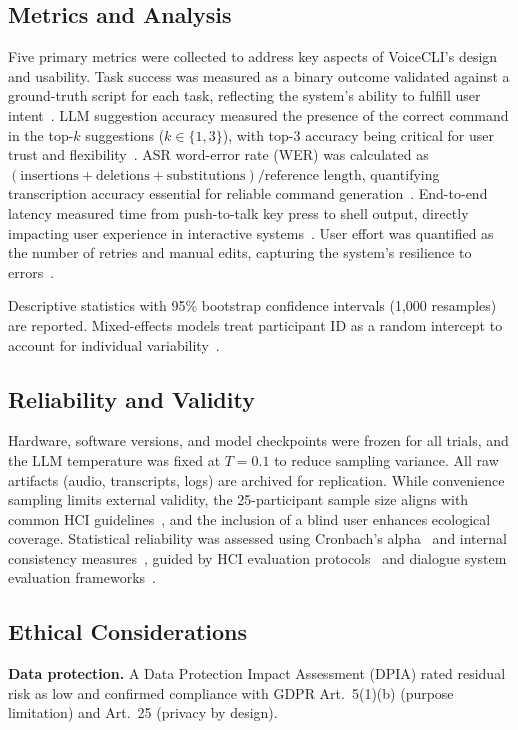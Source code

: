 \documentclass[a4paper,12pt]{article}
\begin{document}
\subsection{Metrics and Analysis}
\label{sec:metrics}
\noindent Five primary metrics were collected to address key aspects of VoiceCLI's design and usability. Task success was measured as a binary outcome validated against a ground-truth script for each task, reflecting the system's ability to fulfill user intent~\cite{ref4}. LLM suggestion accuracy measured the presence of the correct command in the top-$k$ suggestions ($k \in \{1,3\}$), with top-3 accuracy being critical for user trust and flexibility~\cite{ref5}. ASR word-error rate (WER) was calculated as $(\text{insertions}+\text{deletions}+\text{substitutions})/\text{reference length}$, quantifying transcription accuracy essential for reliable command generation~\cite{ref5}. End-to-end latency measured time from push-to-talk key press to shell output, directly impacting user experience in interactive systems~\cite{ref12}. User effort was quantified as the number of retries and manual edits, capturing the system's resilience to errors~\cite{ref4}.

Descriptive statistics with 95\% bootstrap confidence intervals (1,000 resamples) are reported. Mixed-effects models treat participant ID as a random intercept to account for individual variability~\cite{ref12}.

\subsection{Reliability and Validity}
\noindent Hardware, software versions, and model checkpoints were frozen for all trials, and the LLM temperature was fixed at $T=0.1$ to reduce sampling variance. All raw artifacts (audio, transcripts, logs) are archived for replication. While convenience sampling limits external validity, the 25-participant sample size aligns with common HCI guidelines~\cite{ref12}, and the inclusion of a blind user enhances ecological coverage. Statistical reliability was assessed using Cronbach's alpha~\cite{ref23} and internal consistency measures~\cite{ref23}, guided by HCI evaluation protocols~\cite{ref22} and dialogue system evaluation frameworks~\cite{ref18}.

\subsection{Ethical Considerations}
\noindent \textbf{Data protection.} A Data Protection Impact Assessment (DPIA) rated residual risk as low and confirmed compliance with GDPR Art.~5(1)(b) (purpose limitation) and Art.~25 (privacy by design).
\end{document}
